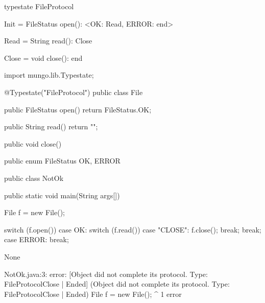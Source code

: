 \begin{code}
typestate FileProtocol {

  Init = {
    FileStatus open(): <OK: Read, ERROR: end>
  }

  Read = {
    String read(): Close
  }

  Close = {
    void close(): end
  }

}\end{code}

\begin{code}
import mungo.lib.Typestate;

@Typestate("FileProtocol")
public class File {

  public FileStatus open() {
    return FileStatus.OK;
  }

  public String read() {
    return "";
  }

  public void close() {

  }

}\end{code}

\begin{code}
public enum FileStatus {
  OK, ERROR
}\end{code}

\begin{code}
public class NotOk {
  public static void main(String args[]) {
    File f = new File();

    switch (f.open()) {
      case OK:
        switch (f.read()) {
          case "CLOSE":
            f.close();
            break;
        }
        break;
      case ERROR:
        break;
    }
  }
}\end{code}

\lstset{language=,caption=Original Mungo output}
\begin{code}
None
\end{code}

\lstset{language=,caption=New Mungo output}
\begin{code}
NotOk.java:3: error: [Object did not complete its protocol. Type: FileProtocol{Close} | Ended] (Object did not complete its protocol. Type: FileProtocol{Close} | Ended)
    File f = new File();
         ^
1 error
\end{code}

